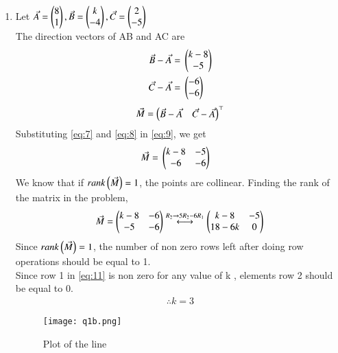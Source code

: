 \documentclass[journal,12pt,twocolumn]{IEEEtran}
\begin{document}
\begin{enumerate}
\item Let $\Vec{A}=\begin{pmatrix}8\\1\end{pmatrix}, \Vec{B}=\begin{pmatrix}k \\ -4\end{pmatrix}, \Vec{C}=\begin{pmatrix}2 \\ -5\end{pmatrix}$\\
The direction vectors of AB and AC are
\begin{align}
\label{eq:7}
\Vec{B} - \Vec{A} ={}& \begin{pmatrix}k-8\\-5\end{pmatrix}\\
\label{eq:8}
\Vec{C} - \Vec{A} ={}& \begin{pmatrix}-6 \\ -6\end{pmatrix}
\end{align}
\begin{align}
\label{eq:9}
\Vec{M} =\begin{pmatrix}\Vec{B}-\Vec{A} & \Vec{C}-\Vec{A}\end{pmatrix}^\top
\end{align}
Substituting \eqref{eq:7} and \eqref{eq:8} in \eqref{eq:9}, we get
\begin{align}
\label{eq:10}
\Vec{M}={}&\begin{pmatrix}k-8 & -5 \\ -6 & -6\end{pmatrix}
\end{align}
We know that if $rank\left(\Vec{M}\right)=1$, the points are collinear.
Finding the rank of the matrix in the problem,
\begin{align}
\label{eq:11}
\Vec{M} = \begin{pmatrix}k-8 & -6 \\ -5 & -6\end{pmatrix} \overset{R_{2}\rightarrow 5R_{2}-6R_{1}}{\longleftrightarrow} \begin{pmatrix}k-8 & -5 \\ 18-6k & 0\end{pmatrix}
\end{align}
Since $rank\left(\Vec{M}\right)=1$, the number of non zero rows left after doing row operations should be equal to 1.\\
Since row 1 in \eqref{eq:11} is non zero for any value of k , elements row 2 should be equal to 0.
\begin{align}
\therefore k=3
\end{align}

\begin{figure}[!h]
\centering
\texttt{[image: q1b.png]}
\caption{Plot of the line}
\end{figure}

\end{enumerate}
\end{document}
